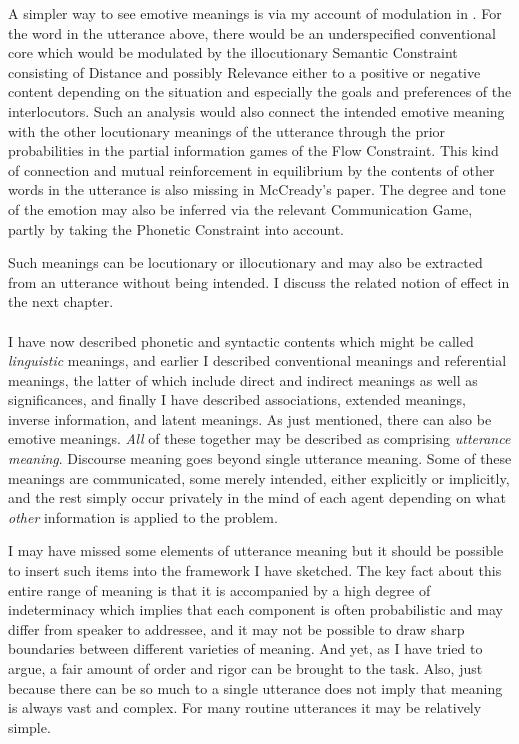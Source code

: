 A simpler way to see emotive meanings is via my account of modulation in . For the word  in the utterance above, there would be an underspecified conventional core which would be modulated by the illocutionary Semantic Constraint consisting of Distance and possibly Relevance either to a positive or negative content depending on the situation and especially the goals and preferences of the interlocutors. Such an analysis would also connect the intended emotive meaning with the other locutionary meanings of the utterance through the prior probabilities in the partial information games of the Flow Constraint. This kind of connection and mutual reinforcement in equilibrium by the contents of other words in the utterance is also missing in McCready's paper. The degree and tone of the emotion may also be inferred via the relevant Communication Game, partly by taking the Phonetic Constraint into account.

Such meanings can be locutionary or illocutionary and may also be extracted from an utterance without being intended. I discuss the related notion of effect in the next chapter.\\\\

\noindent I have now described phonetic and syntactic contents which might be called \emph{linguistic} meanings, and earlier I described conventional meanings and referential meanings, the latter of which include direct and indirect meanings as well as significances, and finally I have described associations, extended meanings, inverse information, and latent meanings. As just mentioned, there can also be emotive meanings. \emph{All} of these together may be described as comprising \emph{utterance meaning}. Discourse meaning goes beyond single utterance meaning. Some of these meanings are communicated, some merely intended, either explicitly or implicitly, and the rest simply occur privately in the mind of each agent depending on what \emph{other} information is applied to the problem.

I may have missed some elements of utterance meaning but it should be possible to insert such items into the framework I have sketched. The key fact about this entire range of meaning is that it is accompanied by a high degree of indeterminacy which implies that each component is often probabilistic and may differ from speaker to addressee, and it may not be possible to draw sharp boundaries between different varieties of meaning. And yet, as I have tried to argue, a fair amount of order and rigor can be brought to the task. Also, just because there can be so much to a single utterance does not imply that meaning is always vast and complex. For many routine utterances it may be relatively simple.

